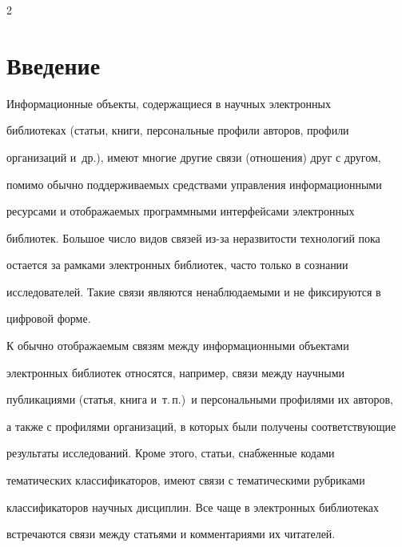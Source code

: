       \begin{multicols}{2}





            \label{st\stat}








\section{Введение}





  Информационные объекты, содержащиеся в научных электронных 


библиотеках (статьи, книги, персональные профили авторов, профили 


организаций и~др.), имеют многие другие связи (отношения) друг с другом, 


помимо обычно поддерживаемых средствами управления информационными 


ресурсами и отображаемых программными интерфейсами электронных 


библиотек. Большое число видов связей из-за неразвитости технологий пока 


остается за рамками электронных библиотек, час\-то только в сознании 


исследователей. Такие связи являются ненаблюдаемыми и не фиксируются в 


цифровой форме. 


  


  К обычно отображаемым связям между информационными объектами 


электронных библиотек относятся, например, связи между научными 


пуб\-ли\-ка\-ци\-ями (статья, книга и~т.\,п.)\ и персональными профилями их авторов, 


а также с профилями организаций, в которых были получены соответствующие 


результаты исследований. Кроме этого, \mbox{статьи}, снабженные кодами 


тематических классификаторов, имеют связи с тематическими рубриками 


классификаторов научных дисциплин. Все чаще в электронных библиотеках 


встречаются связи между статьями и комментариями их читателей. 



\end{multicols}
